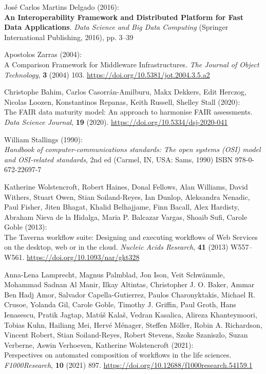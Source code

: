 \begin{thebibliography}{9}
José Carlos Martins Delgado (2016): \\
\textbf{An {Interoperability Framework} and {Distributed Platform} for {Fast Data Applications}}.
\emph{Data {Science} and {Big Data Computing}} ({Springer International
Publishing}, 2016), pp. 3--39

Apostolos Zarras (2004): \\
A {Comparison Framework} for {Middleware Infrastructures}. \emph{The Journal of Object Technology}, \textbf{3}
(2004) 103.
\url{https://doi.org/10.5381/jot.2004.3.5.a2}

Christophe Bahim, Carlos Casorrán-Amilburu, Makx Dekkers, Edit Herczog,
Nicolas Loozen, Konstantinos Repanas, Keith Russell, Shelley Stall
(2020): \\
The {FAIR} data maturity model: {An} approach to harmonise
{FAIR} assessments. \emph{Data Science Journal}, \textbf{19} (2020).
\url{https://doi.org/10.5334/dsj-2020-041}

William Stallings (1990): \\
\emph{Handbook of computer-communications
standards: {The} open systems ({OSI}) model and {OSI-related}
standards}, 2nd ed ({Carmel, IN, USA}: {Sams}, 1990) ISBN
978-0-672-22697-7

Katherine Wolstencroft, Robert Haines, Donal Fellows, Alan Williams,
David Withers, Stuart Owen, Stian Soiland-Reyes, Ian Dunlop, Aleksandra
Nenadic, Paul Fisher, Jiten Bhagat, Khalid Belhajjame, Finn Bacall, Alex
Hardisty, Abraham Nieva de la Hidalga, Maria P. Balcazar Vargas, Shoaib
Sufi, Carole Goble (2013): \\
The {Taverna} workflow suite: Designing
and executing workflows of {Web Services} on the desktop, web or in the
cloud. \emph{Nucleic Acids Research}, \textbf{41} (2013) W557--W561.
\url{https://doi.org/10.1093/nar/gkt328}

Anna-Lena Lamprecht, Magnus Palmblad, Jon Ison, Veit Schwämmle, Mohammad
Sadnan Al Manir, Ilkay Altintas, Christopher J. O. Baker, Ammar Ben Hadj
Amor, Salvador Capella-Gutierrez, Paulos Charonyktakis, Michael R.
Crusoe, Yolanda Gil, Carole Goble, Timothy J. Griffin, Paul Groth, Hans
Ienasescu, Pratik Jagtap, Matúš Kalaš, Vedran Kasalica, Alireza
Khanteymoori, Tobias Kuhn, Hailiang Mei, Hervé Ménager, Steffen Möller,
Robin A. Richardson, Vincent Robert, Stian Soiland-Reyes, Robert
Stevens, Szoke Szaniszlo, Suzan Verberne, Aswin Verhoeven, Katherine
Wolstencroft (2021): \\
Perspectives on automated composition of workflows
in the life sciences. \emph{F1000Research}, \textbf{10} (2021) 897.
\url{https://doi.org/10.12688/f1000research.54159.1}


\end{thebibliography}
